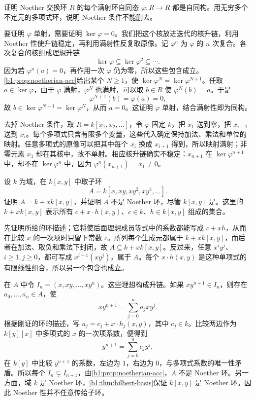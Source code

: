 \begin{exercise}\label{b1:ex:12-noetherian-surjection}
	证明 Noether 交换环 \(R\) 的每个满射环自同态 \(\varphi:R\rightarrow R\) 都是自同构。用无穷多个不定元的多项式环，说明 Noether 条件不能删去。
\end{exercise}
\begin{solution}
	要证明 \(\varphi\) 单射，需要证明 \(\ker\varphi=0\)。我们把这个核放进迭代的核升链，利用 Noether 性使升链稳定，再利用满射性反复取原像。记 \(\varphi^n\) 为 \(\varphi\) 的 \(n\) 次复合。各次复合的核组成理想升链
	\[
		\ker\varphi\subseteq\ker\varphi^2\subseteq\cdots.
	\]
	因为若 \(\varphi^n(a)=0\)，再作用一次 \(\varphi\) 仍为零，所以这些包含成立。\cref{b1:prop:noetherian-acc}给出某个 \(N\ge1\)，使 \(\ker\varphi^N=\ker\varphi^{N+1}\)。任取 \(a\in\ker\varphi\)，由于 \(\varphi\) 满射，\(\varphi^N\) 也满射，可以取 \(b\in R\) 使 \(\varphi^N(b)=a\)。于是
	\[
		\varphi^{N+1}(b)=\varphi(a)=0,
	\]
	故 \(b\in\ker\varphi^{N+1}=\ker\varphi^N\)，从而 \(a=0\)。这证明 \(\varphi\) 单射，结合满射性即为同构。

	去掉 Noether 条件，取 \(R=k[x_1,x_2,\ldots]\)，令 \(\varphi\) 固定 \(k\)，把 \(x_1\) 送到零，把 \(x_{i+1}\) 送到 \(x_i\)。每个多项式只含有限多个变量，这些代入确定保持加法、乘法和单位的映射。任意多项式的原像可以把其中每个 \(x_i\) 换成 \(x_{i+1}\) 得到，所以映射满射；非零元素 \(x_1\) 却在其核中，故不单射。相应核升链确实不稳定：\(x_{n+1}\) 在 \(\ker\varphi^{n+1}\) 中，却不在 \(\ker\varphi^n\) 中，因为 \(\varphi^n(x_{n+1})=x_1\ne0\)。
\end{solution}

\begin{exercise}\label{b1:ex:12-nonnoetherian-subring}
	设 \(k\) 为域，在 \(k[x,y]\) 中取子环
	\[
		A=k[x,xy,xy^2,xy^3,\ldots].
	\]
	证明 \(A=k+xk[x,y]\)，并证明 \(A\) 不是 Noether 环，尽管 \(k[x,y]\) 是。这里的 \(k+xk[x,y]\) 表示所有 \(c+x\cdot h(x,y)\)、\(c\in k\)、\(h\in k[x,y]\) 组成的集合。
\end{exercise}
\begin{solution}
	先证明所给的环描述；它将使后面理想成员等式中的系数都能写成 \(c+xh\)，从而在比较 \(x\) 的一次项时只留下常数 \(c\)。所列每个生成元都属于 \(k+xk[x,y]\)，而后者在加法、取负和乘法下封闭，故 \(A\subseteq k+xk[x,y]\)。反过来，任意 \(x^iy^j\)、\(i\ge1,j\ge0\)，都可写成 \(x^{i-1}(xy^j)\)，属于 \(A\)。每个 \(x\cdot h(x,y)\) 是这种单项式的有限线性组合，所以另一个包含也成立。

	在 \(A\) 中令 \(I_n=(x,xy,\ldots,xy^n)\)。这些理想构成升链。如果 \(xy^{n+1}\in I_n\)，则存在 \(a_0,\ldots,a_n\in A\)，使
	\[
		xy^{n+1}=\sum_{j=0}^n a_jxy^j.
	\]
	根据刚证的环的描述，写 \(a_j=c_j+x\cdot h_j(x,y)\)，其中 \(c_j\in k\)。比较两边作为 \(k[y][x]\) 中多项式的 \(x\) 的一次项系数，便得到
	\[
		y^{n+1}=\sum_{j=0}^n c_jy^j,
	\]
	在 \(k[y]\) 中比较 \(y^{n+1}\) 的系数，左边为 \(1\)，右边为 \(0\)，与多项式系数的唯一性矛盾。所以每个 \(I_n\subsetneq I_{n+1}\)，由\cref{b1:prop:noetherian-acc}，\(A\) 不是 Noether 环。另一方面，域 \(k\) 是 Noether 环，\cref{b1:thm:hilbert-basis}保证 \(k[x,y]\) 是 Noether 环。因此 Noether 性并不任意传给子环。
\end{solution}

